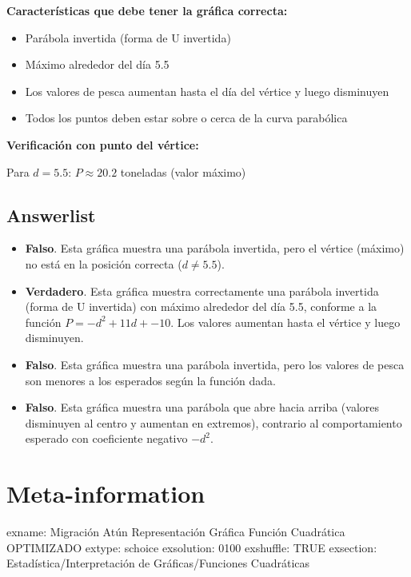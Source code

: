 \documentclass[
]{article}
\providecommand{\tightlist}{%
  \setlength{\itemsep}{0pt}\setlength{\parskip}{0pt}}
\begin{document}
\textbf{Características que debe tener la gráfica correcta:}

\begin{itemize}
\tightlist
\item
  Parábola invertida (forma de U invertida)
\item
  Máximo alrededor del día 5.5
\item
  Los valores de pesca aumentan hasta el día del vértice y luego
  disminuyen
\item
  Todos los puntos deben estar sobre o cerca de la curva parabólica
\end{itemize}

\textbf{Verificación con punto del vértice:}

Para \(d = 5.5\): \(P \approx 20.2\) toneladas (valor máximo)

\subsection{Answerlist}\label{answerlist-1}

\begin{itemize}
\tightlist
\item
  \textbf{Falso}. Esta gráfica muestra una parábola invertida, pero el
  vértice (máximo) no está en la posición correcta (\(d \neq 5.5\)).
\item
  \textbf{Verdadero}. Esta gráfica muestra correctamente una parábola
  invertida (forma de U invertida) con máximo alrededor del día 5.5,
  conforme a la función \(P = -d^2 + 11d + -10\). Los valores aumentan
  hasta el vértice y luego disminuyen.
\item
  \textbf{Falso}. Esta gráfica muestra una parábola invertida, pero los
  valores de pesca son menores a los esperados según la función dada.
\item
  \textbf{Falso}. Esta gráfica muestra una parábola que abre hacia
  arriba (valores disminuyen al centro y aumentan en extremos),
  contrario al comportamiento esperado con coeficiente negativo
  \(-d^2\).
\end{itemize}

\section{Meta-information}\label{meta-information}

exname: Migración Atún Representación Gráfica Función Cuadrática
OPTIMIZADO extype: schoice exsolution: 0100 exshuffle: TRUE exsection:
Estadística/Interpretación de Gráficas/Funciones Cuadráticas
\end{document}
